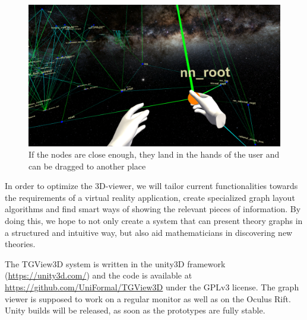 \documentclass{llncs}
\begin{document}
\begin{figure}\centering
    \includegraphics[width=1\textwidth ]{grab}
    \caption{If the nodes are close enough, they land in the hands of the user and can be dragged to another place}
    \label{fig:sample_figure4}
\end{figure}

In order to optimize the 3D-viewer, we will tailor current functionalities towards the
requirements of a virtual reality application, create specialized graph layout algorithms
and find smart ways of showing the relevant pieces of information. By doing this, we
hope to not only create a system that can present theory graphs in a structured and
intuitive way, but also aid mathematicians in discovering new theories.

The TGView3D system is written in the unity3D framework (\url{https://unity3d.com/}) and the code is available at \url{https://github.com/UniFormal/TGView3D} under the GPLv3 license.
The graph viewer is supposed to work on a regular monitor as well as on the Oculus Rift. Unity builds will be released, as soon as the prototypes are fully stable.

\printbibliography
\end{document}
